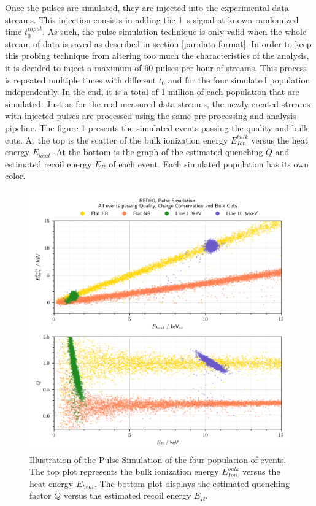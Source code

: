 Once the pulses are simulated, they are injected into the experimental data streams. This injection consists in adding the \SI{1}{\s} signal at known randomized time $t_0^{input}$. As such, the pulse simulation technique is only valid when the whole stream of data is saved as described in section \ref{par:data-format}. In order to keep this probing technique from altering too much the characteristics of the analysis, it is decided to inject a maximum of 60 pulses per hour of streams. This process is repeated multiple times with different $t_0$ and for the four simulated population independently. In the end, it is a total of 1 million of each population that are simulated. Just as for the real measured data streams, the newly created streams with injected pulses are processed using the same pre-processing and analysis pipeline.
The figure \ref{fig:band-cut-ecei-simu} presents the simulated events passing the quality and bulk cuts. At the top is the scatter of the bulk ionization energy $E_{Ion.}^{bulk}$ versus the heat energy $E_{heat}$. At the bottom is the graph of the estimated quenching $Q$ and estimated recoil energy $E_R$ of each event. Each simulated population has its own color.

\begin{figure}
\centering
\includegraphics[scale=1]{Figures/Neutron/pulse_simulation.png}
\caption{Illustration of the Pulse Simulation of the four population of events. The top plot represents the bulk ionization energy $E_{Ion.}^{bulk}$ versus the heat energy $E_{heat}$. The bottom plot displays the estimated quenching factor $Q$ versus the estimated recoil energy $E_R$.}
\label{fig:band-cut-ecei-simu}
\end{figure}


